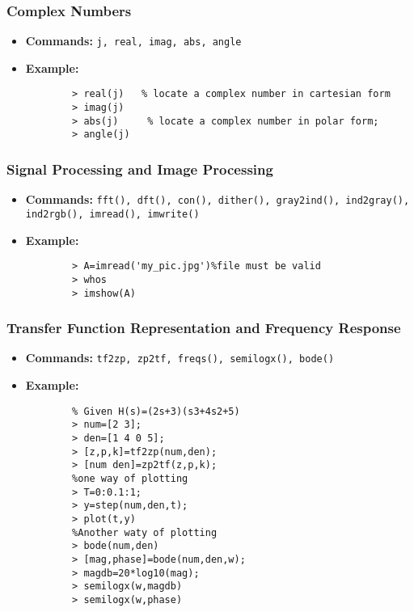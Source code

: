 \documentclass[a4paper,11pt]{article}
\begin{document}
\subsubsection{Complex Numbers}
\begin{itemize}
    \item \textbf{Commands:} \texttt{j, real, imag, abs, angle}
    \item \textbf{Example:}
          \begin{verbatim}
        > real(j)   % locate a complex number in cartesian form  
        > imag(j)
        > abs(j)     % locate a complex number in polar form;
        > angle(j)
\end{verbatim}
\end{itemize}

\subsubsection{Signal Processing and
    Image Processing}
\begin{itemize}
    \item \textbf{Commands:} \texttt{fft(), dft(), con(), dither(), gray2ind(), ind2gray(), \\ind2rgb(), imread(), imwrite()}
    \item \textbf{Example:}
          \begin{verbatim}
        > A=imread('my_pic.jpg')%file must be valid
        > whos
        > imshow(A)
\end{verbatim}
\end{itemize}

\subsubsection{Transfer Function Representation and Frequency Response}
\begin{itemize}
    \item \textbf{Commands:} \texttt{tf2zp, zp2tf, freqs(), semilogx(), bode()}
    \item \textbf{Example:}
          \begin{verbatim}
        % Given H(s)=(2s+3)(s3+4s2+5)
        > num=[2 3];
        > den=[1 4 0 5];
        > [z,p,k]=tf2zp(num,den);
        > [num den]=zp2tf(z,p,k);
        %one way of plotting
        > T=0:0.1:1;
        > y=step(num,den,t);
        > plot(t,y)
        %Another waty of plotting
        > bode(num,den)
        > [mag,phase]=bode(num,den,w);
        > magdb=20*log10(mag);
        > semilogx(w,magdb)
        > semilogx(w,phase)
\end{verbatim}
\end{itemize}
\end{document}
